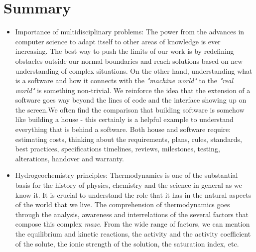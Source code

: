 \section{Summary}
\begin{itemize}
\item Importance of multidisciplinary problems: The power from the advances in computer science to adapt itself to other areas of knowledge is ever increasing. The best way to push the limits of our work is by redefining obstacles outside our normal boundaries and reach solutions based on new understanding of complex situations. On the other hand, understanding what is a software and how it connects with the \emph{"machine world"} to the \emph{"real world"} is something non-trivial. We reinforce the idea that the extension of a software goes way beyond the lines of code and the interface showing up on the screen.We often find the comparison that building software is somehow like building a house - this certainly is a helpful example to understand everything that is behind a software. Both house and software require: estimating costs, thinking about the requirements, plans, rules, standards, best practices, specifications timelines, reviews, milestones, testing, alterations, handover and warranty.
\item Hydrogeochemistry principles: Thermodynamics is one of the substantial basis for the history of physics, chemistry and the science in general as we know it. It is crucial to understand the role that it has in the natural aspects of the world that we live. The comprehension of thermodynamics goes through the analysis, awareness and interrelations of the several factors that compose this complex \emph{maze}. From the wide range of factors, we can mention the equilibrium and kinetic reactions, the activity and the activity coefficient of the solute, the ionic strength of the solution, the saturation index, etc.
\end{itemize}